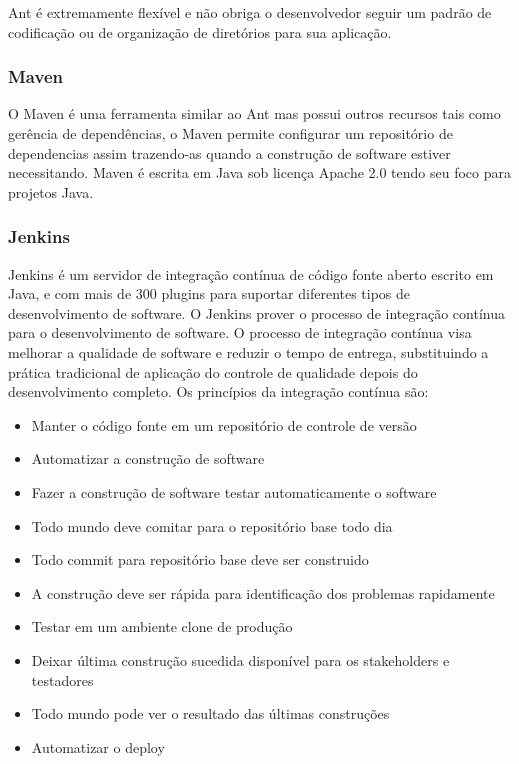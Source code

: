 \documentclass[12pt,a4paper]{article}
\begin{document}
			Ant é extremamente flexível e não obriga o desenvolvedor seguir um padrão de codificação ou de organização de
			diretórios para sua aplicação.
			
		\subsubsection{Maven}
		
			O Maven é uma ferramenta similar ao Ant mas possui outros recursos tais como gerência de dependências, o Maven
			permite configurar um repositório de dependencias assim trazendo-as quando a construção de software estiver necessitando.
			Maven é escrita em Java sob licença Apache 2.0 tendo seu foco para projetos Java.
			
		\subsubsection{Jenkins}
		
			Jenkins é um servidor de integração contínua de código fonte aberto escrito em Java, e com mais de 300 plugins para
			suportar diferentes tipos de desenvolvimento de software. O Jenkins prover o processo de integração contínua para o
			desenvolvimento de software.
			O processo de integração contínua visa melhorar a qualidade de software e reduzir o tempo de entrega, substituindo a
			prática tradicional de aplicação do controle de qualidade depois do desenvolvimento completo. Os princípios da
			integração contínua são:
			\begin{itemize}
			  \item Manter o código fonte em um repositório de controle de versão
			  \item Automatizar a construção de software
			  \item Fazer a construção de software testar automaticamente o software
			  \item Todo mundo deve comitar para o repositório base todo dia
			  \item Todo commit para repositório base deve ser construido
			  \item A construção deve ser rápida para identificação dos problemas rapidamente
			  \item Testar em um ambiente clone de produção
			  \item Deixar última construção sucedida disponível para os stakeholders e testadores
			  \item Todo mundo pode ver o resultado das últimas construções
			  \item Automatizar o deploy
			\end{itemize}
			
\end{document}
